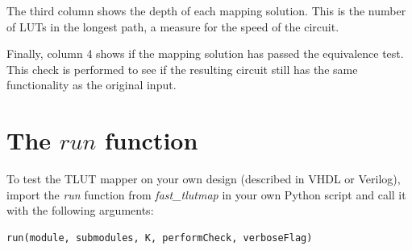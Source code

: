 \documentclass[a4paper,oneside]{memoir}
\begin{document}
\begin{enumerate}
The third column shows the depth of each mapping solution. This is the number of LUTs in the longest path, a measure for the speed of the circuit. 

Finally, column 4 shows if the mapping solution has passed the equivalence test. This check is performed to see if the resulting circuit still has the same functionality as the original input.


\end{enumerate}


\section{The $run$ function}\label{sec:run_function}
To test the TLUT mapper on your own design (described in VHDL or Verilog), import the \emph{run} function from \emph{fast\_tlutmap} in your own Python script and call it with the following arguments:
\begin{lstlisting}
run(module, submodules, K, performCheck, verboseFlag)
\end{lstlisting}
\end{document}
